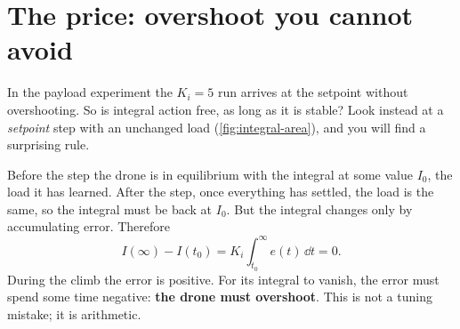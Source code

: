 
\section{The price: overshoot you cannot avoid}

In the payload experiment the $K_i = 5$ run arrives at the setpoint without overshooting. So is integral action free, as long as it is stable? Look instead at a \emph{setpoint} step with an unchanged load (\cref{fig:integral-area}), and you will find a surprising rule.


Before the step the drone is in equilibrium with the integral at some value $I_0$, the load it has learned. After the step, once everything has settled, the load is the same, so the integral must be back at $I_0$. But the integral changes only by accumulating error. Therefore
\begin{equation}\label{eq:integral-area}
  I(\infty) - I(t_0) = K_i\int_{t_0}^{\infty} e(t)\,\dd t = 0 .
\end{equation}
During the climb the error is positive. For its integral to vanish, the error must spend some time negative: \textbf{the drone must overshoot}. This is not a tuning mistake; it is arithmetic.

